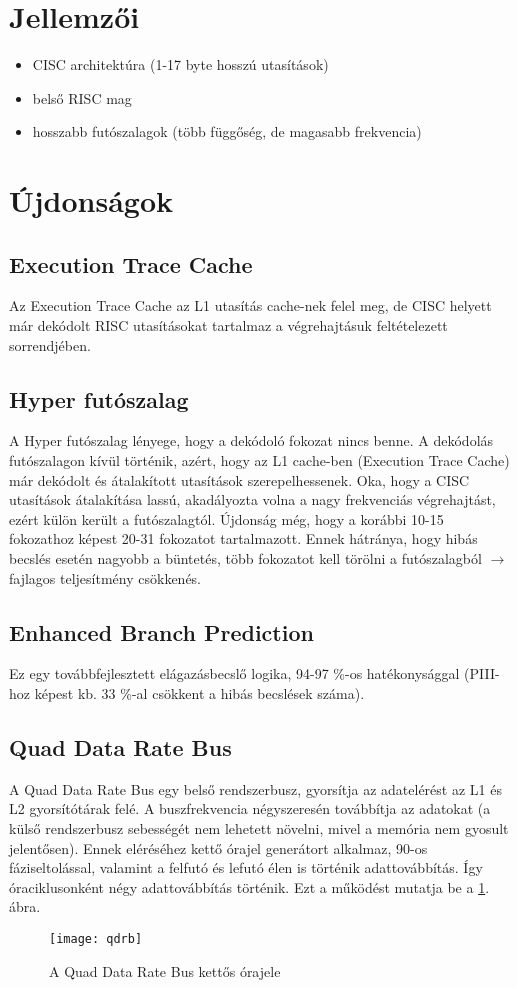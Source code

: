 \section{Jellemzői}
\begin{itemize}
    \item CISC architektúra (1-17 byte hosszú utasítások)
    \item belső RISC mag
    \item hosszabb futószalagok (több függőség, de magasabb frekvencia)
\end{itemize}

\section{Újdonságok}

\subsection{Execution Trace Cache}
Az Execution Trace Cache az L1 utasítás cache-nek felel meg, de CISC helyett már dekódolt RISC utasításokat tartalmaz a végrehajtásuk feltételezett sorrendjében.

\subsection{Hyper futószalag}
A Hyper futószalag lényege, hogy a dekódoló fokozat nincs benne.
A dekódolás futószalagon kívül történik, azért, hogy az L1 cache-ben (Execution Trace Cache) már dekódolt és átalakított utasítások szerepelhessenek.
Oka, hogy a CISC utasítások átalakítása lassú, akadályozta volna a nagy frekvenciás végrehajtást, ezért külön került a futószalagtól.
Újdonság még, hogy a korábbi 10-15 fokozathoz képest 20-31 fokozatot tartalmazott.
Ennek hátránya, hogy hibás becslés esetén nagyobb a büntetés, több fokozatot kell törölni a futószalagból $\rightarrow$ fajlagos teljesítmény csökkenés.

\subsection{Enhanced Branch Prediction}
Ez egy továbbfejlesztett elágazásbecslő logika, 94-97 \%-os hatékonysággal (PIII-hoz képest kb. 33 \%-al csökkent a hibás becslések száma).

\subsection{Quad Data Rate Bus}
A Quad Data Rate Bus egy belső rendszerbusz, gyorsítja az adatelérést az L1 és L2 gyorsítótárak felé.
A buszfrekvencia négyszeresén továbbítja az adatokat (a külső rendszerbusz sebességét nem lehetett növelni, mivel a memória nem gyosult jelentősen). Ennek eléréséhez kettő órajel generátort alkalmaz, 90\textdegree-os fáziseltolással, valamint a felfutó és lefutó élen is történik adattovábbítás.
Így óraciklusonként négy adattovábbítás történik.
Ezt a működést mutatja be a \ref{fig:qdrb}. ábra.
\begin{figure}[h]
    \texttt{[image: qdrb]}
    \centering
    \caption{A Quad Data Rate Bus kettős órajele}
    \label{fig:qdrb}
\end{figure}

